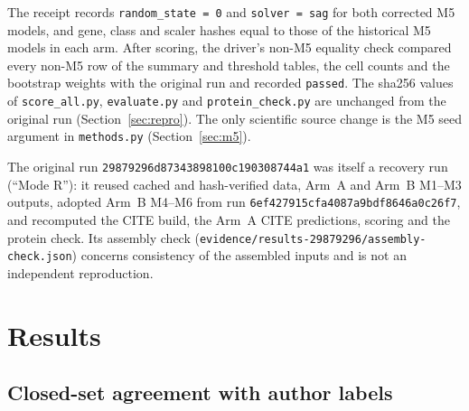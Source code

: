 \documentclass[11pt]{article}
\newcommand{\origrunid}{\nolinkurl{29879296d87343898100c190308744a1}}
\newcommand{\code}[1]{\texttt{#1}}
\begin{document}
\noindent The receipt records \code{random\_state = 0} and \code{solver = sag} for both corrected M5 models, and gene, class and scaler hashes equal to those of the historical M5 models in each arm. After scoring, the driver's non-M5 equality check compared every non-M5 row of the summary and threshold tables, the cell counts and the bootstrap weights with the original run and recorded \verb|passed|. The sha256 values of \nolinkurl{score_all.py}, \nolinkurl{evaluate.py} and \nolinkurl{protein_check.py} are unchanged from the original run (Section~\ref{sec:repro}). The only scientific source change is the M5 seed argument in \nolinkurl{methods.py} (Section~\ref{sec:m5}).

The original run \origrunid{} was itself a recovery run (``Mode R''): it reused cached and hash-verified data, Arm~A and Arm~B M1--M3 outputs, adopted Arm~B M4--M6 from run \nolinkurl{6ef427915cfa4087a9bdf8646a0c26f7}, and recomputed the CITE build, the Arm~A CITE predictions, scoring and the protein check. Its assembly check (\nolinkurl{evidence/results-29879296/assembly-check.json}) concerns consistency of the assembled inputs and is not an independent reproduction.

\section{Results}\label{sec:results}

\subsection{Closed-set agreement with author labels}
\end{document}
